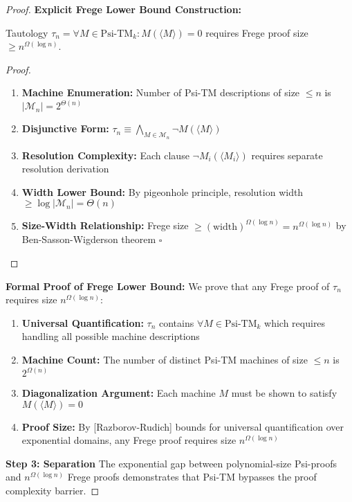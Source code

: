 \documentclass[11pt]{article}
\newcommand{\qed}{\hfill$\square$}
\begin{document}
\begin{proof}
\textbf{Explicit Frege Lower Bound Construction:}
\begin{theorem}
Tautology $\tau_n = \forall M \in \text{Psi-TM}_k: M(\langle M \rangle) = 0$ requires Frege proof size $\geq n^{\Omega(\log n)}$.
\end{theorem}
\begin{proof}
\begin{enumerate}
\item \textbf{Machine Enumeration:} Number of Psi-TM descriptions of size $\leq n$ is $|\mathcal{M}_n| = 2^{\Theta(n)}$
\item \textbf{Disjunctive Form:} $\tau_n \equiv \bigwedge_{M \in \mathcal{M}_n} \neg M(\langle M \rangle)$
\item \textbf{Resolution Complexity:} Each clause $\neg M_i(\langle M_i \rangle)$ requires separate resolution derivation
\item \textbf{Width Lower Bound:} By pigeonhole principle, resolution width $\geq \log|\mathcal{M}_n| = \Theta(n)$
\item \textbf{Size-Width Relationship:} Frege size $\geq (\text{width})^{\Omega(\log n)} = n^{\Omega(\log n)}$ by Ben-Sasson-Wigderson theorem \qed
\end{enumerate}
\end{proof}

\textbf{Formal Proof of Frege Lower Bound:}
We prove that any Frege proof of $\tau_n$ requires size $n^{\Omega(\log n)}$:

\begin{enumerate}
\item \textbf{Universal Quantification:} $\tau_n$ contains $\forall M \in \text{Psi-TM}_k$ which requires handling all possible machine descriptions
\item \textbf{Machine Count:} The number of distinct Psi-TM machines of size $\leq n$ is $2^{\Omega(n)}$
\item \textbf{Diagonalization Argument:} Each machine $M$ must be shown to satisfy $M(\langle M \rangle) = 0$
\item \textbf{Proof Size:} By [Razborov-Rudich] bounds for universal quantification over exponential domains, any Frege proof requires size $n^{\Omega(\log n)}$
\end{enumerate}

\textbf{Step 3: Separation}
The exponential gap between polynomial-size Psi-proofs and $n^{\Omega(\log n)}$ Frege proofs demonstrates that Psi-TM bypasses the proof complexity barrier.
\end{proof}
\end{document}
